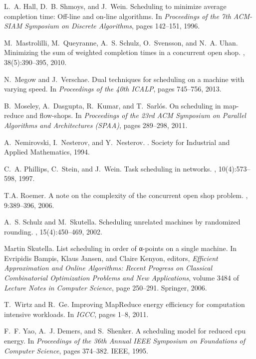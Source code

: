 \documentclass{llncs}
\begin{document}
\begin{thebibliography}{10}
L.~A. Hall, D.~B. Shmoys, and J.~Wein.
\newblock Scheduling to minimize average completion time: Off-line and on-line
  algorithms.
\newblock In {\em Proceedings of the 7th {ACM-SIAM} Symposium on Discrete
  Algorithms}, pages 142--151, 1996.

M.~Mastrolilli, M.~Queyranne, A.~S. Schulz, O.~Svensson, and N.~A. Uhan.
\newblock Minimizing the sum of weighted completion times in a concurrent open
  shop.
, 38(5):390--395, 2010.

N.~Megow and J.~Verschae.
\newblock Dual techniques for scheduling on a machine with varying speed.
\newblock In {\em Proceedings of the 40th ICALP}, pages 745--756, 2013.

B.~Moseley, A.~Dasgupta, R.~Kumar, and T.~Sarl{\'o}s.
\newblock On scheduling in map-reduce and flow-shops.
\newblock In {\em Proceedings of the 23rd {ACM} Symposium on Parallel
  Algorithms and Architectures (SPAA)}, pages 289--298, 2011.

A.~Nemirovski, I.~Nesterov, and Y.~Nesterov.
.
\newblock Society for Industrial and Applied Mathematics, 1994.

C.~A. Phillips, C.~Stein, and J.~Wein.
\newblock Task scheduling in networks.
, 10(4):573--598, 1997.

T.A. Roemer.
\newblock A note on the complexity of the concurrent open shop problem.
, 9:389--396, 2006.

A.~S. Schulz and M.~Skutella.
\newblock Scheduling unrelated machines by randomized rounding.
, 15(4):450--469, 2002.

Martin Skutella.
\newblock List scheduling in order of α-points on a single machine.
\newblock In Evripidis Bampis, Klaus Jansen, and Claire Kenyon, editors, {\em
  Efficient Approximation and Online Algorithms: Recent Progress on Classical
  Combinatorial Optimization Problems and New Applications}, volume 3484 of
  {\em Lecture Notes in Computer Science}, page 250–291. Springer, 2006.

T.~Wirtz and R.~Ge.
\newblock Improving {M}ap{R}educe energy efficiency for computation intensive
  workloads.
\newblock In {\em IGCC}, pages 1--8, 2011.

F.~F. Yao, A.~J. Demers, and S.~Shenker.
\newblock A scheduling model for reduced cpu energy.
\newblock In {\em Proceedings of the 36th Annual {IEEE} Symposium on
  Foundations of Computer Science}, pages 374--382. {IEEE}, 1995.

\end{thebibliography}
\end{document}
